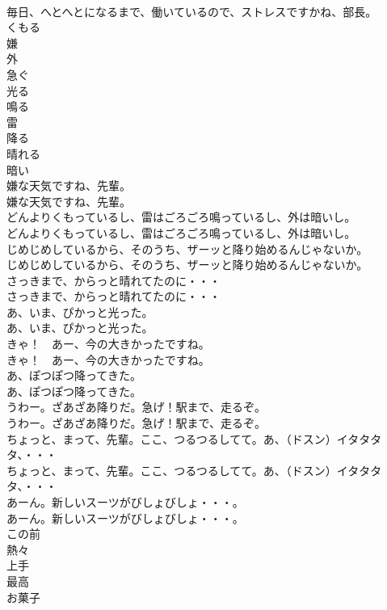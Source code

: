 \documentclass[8pt]{extreport}
\begin{document}
\begin{CJK}{UTF8}{min}
\\	毎日、へとへとになるまで、働いているので、ストレスですかね、部長。 
\\	くもる
\\	嫌
\\	外
\\	急ぐ
\\	光る
\\	鳴る
\\	雷
\\	降る
\\	晴れる
\\	暗い
\\	嫌な天気ですね、先輩。	
\\	嫌な天気ですね、先輩。 
\\	どんよりくもっているし、雷はごろごろ鳴っているし、外は暗いし。	
\\	どんよりくもっているし、雷はごろごろ鳴っているし、外は暗いし。 
\\	じめじめしているから、そのうち、ザーッと降り始めるんじゃないか。	
\\	じめじめしているから、そのうち、ザーッと降り始めるんじゃないか。 
\\	さっきまで、からっと晴れてたのに・・・	
\\	さっきまで、からっと晴れてたのに・・・ 
\\	あ、いま、ぴかっと光った。	
\\	あ、いま、ぴかっと光った。 
\\	きゃ！　あー、今の大きかったですね。	
\\	きゃ！　あー、今の大きかったですね。 
\\	あ、ぽつぽつ降ってきた。	
\\	あ、ぽつぽつ降ってきた。 
\\	うわー。ざあざあ降りだ。急げ！駅まで、走るぞ。	
\\	うわー。ざあざあ降りだ。急げ！駅まで、走るぞ。 
\\	ちょっと、まって、先輩。ここ、つるつるしてて。あ、（ドスン）イタタタタ、・・・	
\\	ちょっと、まって、先輩。ここ、つるつるしてて。あ、（ドスン）イタタタタ、・・・ 
\\	あーん。新しいスーツがびしょびしょ・・・。	
\\	あーん。新しいスーツがびしょびしょ・・・。 
\\	この前
\\	熱々
\\	上手
\\	最高
\\	お菓子

\end{CJK}
\end{document}
